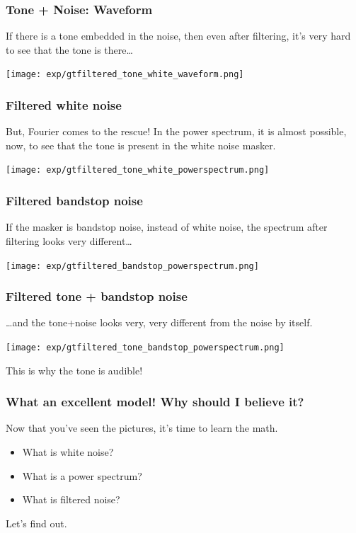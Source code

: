 \documentclass{beamer}
\begin{document}
\begin{frame}
  \frametitle{Tone + Noise: Waveform}

  If there is a tone embedded in the noise, then even after filtering, it's
  very hard to see that the tone is there\ldots
  
  \centerline{\texttt{[image: exp/gtfiltered\_tone\_white\_waveform.png]}}
\end{frame}
     
\begin{frame}
  \frametitle{Filtered white noise}

  But, Fourier comes to the rescue!  In the power spectrum, it is
  almost possible, now, to see that the tone is present in the white noise masker.
  
  \centerline{\texttt{[image: exp/gtfiltered\_tone\_white\_powerspectrum.png]}}
\end{frame}
     
\begin{frame}
  \frametitle{Filtered bandstop noise}

  If the masker is bandstop noise, instead of white noise, the spectrum
  after filtering looks very different\ldots
  
  \centerline{\texttt{[image: exp/gtfiltered\_bandstop\_powerspectrum.png]}}
\end{frame}
     
\begin{frame}
  \frametitle{Filtered tone + bandstop noise}

  \ldots and the tone+noise looks very, very different from the noise by itself.
  \centerline{\texttt{[image: exp/gtfiltered\_tone\_bandstop\_powerspectrum.png]}}
  \centerline{\huge This is why the tone is audible!}
\end{frame}

\begin{frame}
  \frametitle{What an excellent model!  Why should  I believe it?}

  Now that  you've seen the pictures, it's time to learn the math.
  \begin{itemize}
  \item What is white noise?
  \item What is a power spectrum?
  \item What is filtered noise?
  \end{itemize}
  Let's find out.
\end{frame}

\end{document}
